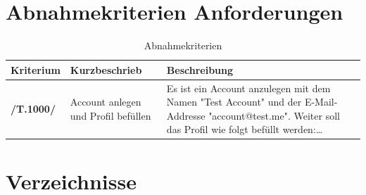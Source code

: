 \documentclass[10pt,a4paper,titlepage,twoside,german,final]{zhawreprt}
\newcommand{\AddRequirement}[2]{
\textbf{/#1#2/}
}
\newcommand{\TF}[1]{
\AddRequirement{T.}{#1}
}
\numberwithin{table}{chapter}
\begin{document}
\chapter{Abnahmekriterien Anforderungen}\label{chp:TestRequirements}
\begin{table}[ht]\centering
\begin{tabular}{l|p{4cm}|p{8cm}}\hline
Kriterium & Kurzbeschrieb & Beschreibung\\\hline
\TF{1000} & Account anlegen und Profil befüllen & Es ist ein Account anzulegen mit dem Namen "Test Account" und der E-Mail-Addresse "account@test.me". Weiter soll das Profil wie folgt befüllt werden:\ldots
\end{tabular}
\caption{Abnahmekriterien}\label{tbl:TestRequirements}
\end{table}
\chapter{Verzeichnisse}\label{chp:Index}
\printglossaries\label{sec:Glossar}
\listoftables
\listoffigures
\printindex
\newpage
\label{sec:Bibliography}
\end{document}

